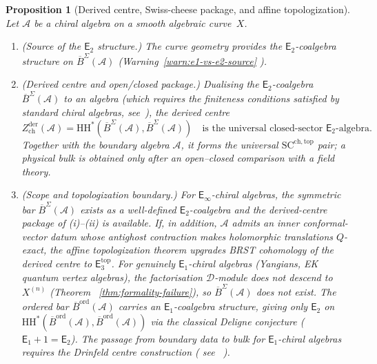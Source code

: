\documentclass[11pt,reqno]{amsart}
\newtheorem{proposition}[theorem]{Proposition}
\theoremstyle{definition}
\theoremstyle{remark}
\newcommand{\cA}{\mathcal{A}}
\newcommand{\cD}{\mathcal{D}}
\newcommand{\HH}{\mathrm{HH}}
\newcommand{\Eone}{\mathsf{E}_{1}}
\newcommand{\Etwo}{\mathsf{E}_{2}}
\providecommand{\Ethree}{\mathsf{E}_{3}}
\newcommand{\Einf}{\mathsf{E}_{\infty}}
\newcommand{\Barord}{\overline{B}^{\mathrm{ord}}}
\newcommand{\BarSig}{\overline{B}^{\Sigma}}
\numberwithin{equation}{section}
\begin{document}
\begin{proposition}[Derived centre, Swiss-cheese package,
and affine topologization]
\label{prop:e3-structure}
Let $\cA$ be a chiral algebra on a smooth algebraic
curve~$X$.
\begin{enumerate}[label=\textup{(\roman*)}]
\item \textup{(Source of the $\Etwo$ structure.)}
  The curve geometry provides the $\Etwo$-coalgebra
  structure on $\BarSig(\cA)$
  \textup{(}Warning~\textup{\ref{warn:e1-vs-e2-source}}%
  \textup{)}.
\item \textup{(Derived centre and open/closed package.)}
  Dualising the $\Etwo$-coalgebra $\BarSig(\cA)$ to an
  algebra \textup{(}which requires the finiteness
  conditions satisfied by standard chiral algebras,
  see~\cite[Thm~A]{Lorgat26I}\textup{)}, the derived centre
  \begin{equation}\label{eq:e3-hdc}
    Z^{\mathrm{der}}_{\mathrm{ch}}(\cA)
    = \HH^*(\BarSig(\cA), \BarSig(\cA))
    \quad \text{is the universal closed-sector $\Etwo$-algebra.}
  \end{equation}
  Together with the boundary algebra $\cA$, it forms the
  universal $\mathrm{SC}^{\mathrm{ch,top}}$ pair; a physical bulk is
  obtained only after an open--closed comparison with a field theory.
\item \textup{(Scope and topologization boundary.)} For
  $\Einf$-chiral algebras, the
  symmetric bar $\BarSig(\cA)$ exists as a well-defined
  $\Etwo$-coalgebra and the derived-centre package of
  \textup{(i)--(ii)} is available. If, in addition, $\cA$
  admits an inner conformal-vector datum whose antighost contraction
  makes holomorphic translations $Q$-exact, the affine topologization theorem
  upgrades BRST cohomology of the derived centre to
  $\Ethree^{\mathrm{top}}$.
  For genuinely $\Eone$-chiral algebras
  \textup{(}Yangians, EK quantum vertex algebras\textup{)},
  the factorisation $\cD$-module does not descend to
  $X^{(n)}$ \textup{(}Theorem~%
  \textup{\ref{thm:formality-failure}}\textup{)},
  so $\BarSig(\cA)$ does not exist. The ordered bar
  $\Barord(\cA)$ carries an $\Eone$-coalgebra structure,
  giving only $\Etwo$ on
  $\HH^*(\Barord(\cA), \Barord(\cA))$
  via the classical Deligne conjecture
  \textup{(}$\Eone + 1 = \Etwo$\textup{)}.
  The passage from boundary data to bulk for $\Eone$-chiral
  algebras requires the Drinfeld centre construction
  \textup{(}%
  see~\cite[conj:drinfeld-center-equals-bulk]{Lorgat26III}%
  \textup{)}.
\end{enumerate}
\end{proposition}
\end{document}
